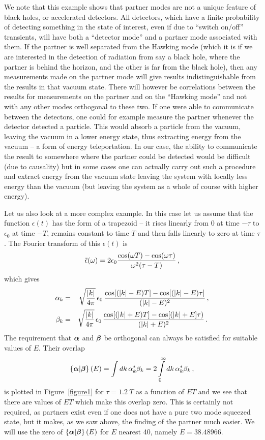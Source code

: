 \documentclass[aps,prd,showpacs,amssymb,nofootinbib,twocolumn]{revtex4}
\newcommand{\scalar}[2]{\left\{#1|#2\right\}}
\newcommand{\nn}{\nonumber\\}
\newcommand{\f}[1]{\mbox{\boldmath$#1$}}
\newcommand{\bea}{\begin{eqnarray}}
\newcommand{\eea}{\end{eqnarray}}
\begin{document}
We note that this example shows that partner modes are not a unique feature of
black holes, or accelerated detectors. 
%
All detectors, which have a finite probability of detecting something in the 
state of interest, even if due to ``switch on/off'' transients,  will have 
both a ``detector mode'' and a partner mode associated with them. 
%
If the partner is well separated from the Hawking mode (which it is if we are
interested in the detection of radiation from say a black hole, where the
partner is behind the horizon, and the other is far from the black hole), 
then any measurements made on the partner mode will give results 
indistinguishable from the results in that vacuum state. 
%
There will however be correlations between the results for measurements on the 
partner and on the ``Hawking mode'' and not with any other modes orthogonal 
to these two. 
%
If one were able to communicate between the detectors, one could for example
measure the partner whenever the detector detected a particle. 
%
This would absorb a particle from the vacuum, leaving the vacuum in a lower 
energy state, thus extracting energy from the vacuum -- a form of energy 
teleportation. 
%
In our case, the ability to communicate the result to somewhere where the 
partner could be detected would be difficult (due to causality) but in some 
cases \cite {hotta} one can actually carry out such a procedure and extract 
energy from the vacuum state leaving the system with locally less energy than 
the vacuum (but leaving the system as a whole of course with higher energy).

Let us also look at a more complex example. 
%
In this case let us assume that the function $\epsilon(t)$ has the form of a 
trapezoid -- it rises linearly from 0 at time $-\tau$ to $\epsilon_0$ at time  
$-T$, remains constant to time $T$ and then falls linearly to zero at time 
$\tau$.
The Fourier transform of this $\epsilon(t)$ is
%
\bea
\tilde\epsilon(\omega)
=  
2\epsilon_0
{\cos(\omega T)-\cos(\omega\tau)\over\omega^2(\tau-T)}
\,,
\eea
%
%
which gives %
%
\bea
\alpha_k &=& \sqrt{|k|\over4\pi}\,\epsilon_0\, 
{\cos[(|k|- E)T]-\cos[(|k|- E)\tau]\over(|k|- E)^2}
\,,
\nn
\beta_k &=& \sqrt{|k|\over 4\pi}\, \epsilon_0\,
{\cos[(|k|+ E)T]-\cos[(|k|+ E]\tau)\over(|k|+ E)^2}
\,.\,
\eea
%
The requirement that $\f{\alpha}$ and $\f{\beta}$ be orthogonal can always 
be satisfied for suitable values of $E$. 
%
Their overlap 
%
\bea
\scalar{\f{\alpha}}{\f{\beta}}(E)
=
\int dk\,\alpha^*_{k}\beta_{k}
=
2\int\limits_0^\infty dk\,\alpha^*_{k}\beta_{k}
\,,
\eea
%
is plotted in Figure~\ref{figure1} for $\tau=1.2~T$ as a function of $ET$ 
and we see that there are values of $ET$ which make this overlap zero. 
%
This is certainly not required, as partners exist even if one does not have 
a pure two mode squeezed state, but it makes, as we saw above, the finding of 
the partner much easier.  
%
We will use the zero of $\scalar{\f{\alpha}}{\f{\beta}}(E)$
for $E$ nearest 40, namely $E=38.48966$.  
\end{document}
